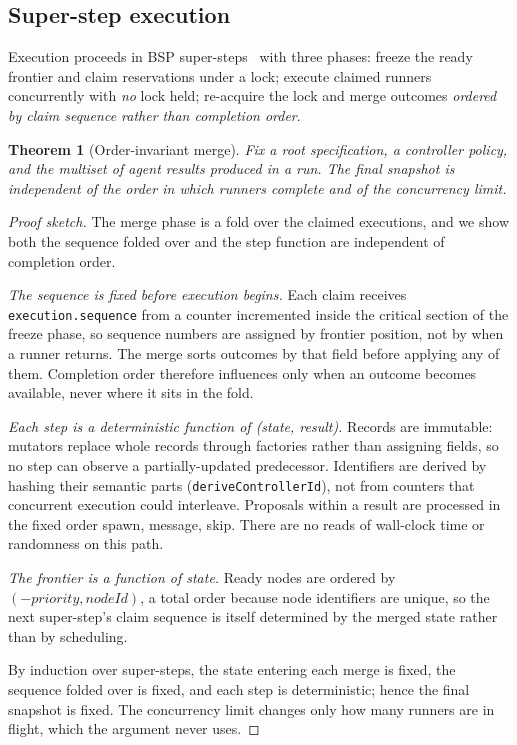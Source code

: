 \documentclass[10pt]{article}
\newtheorem{theorem}{Theorem}
\begin{document}
\subsection{Super-step execution}

Execution proceeds in BSP super-steps~\citep{valiant1990bsp} with three phases:
freeze the ready frontier and claim reservations under a lock; execute claimed
runners concurrently with \emph{no} lock held; re-acquire the lock and merge
outcomes \emph{ordered by claim sequence rather than completion order}.

\begin{theorem}[Order-invariant merge]
\label{thm:order}
Fix a root specification, a controller policy, and the multiset of agent results
produced in a run. The final snapshot is independent of the order in which
runners complete and of the concurrency limit.
\end{theorem}

\begin{proof}[Proof sketch]
The merge phase is a fold over the claimed executions, and we show both the
sequence folded over and the step function are independent of completion order.

\emph{The sequence is fixed before execution begins.} Each claim receives
\texttt{execution.sequence} from a counter incremented inside the critical
section of the freeze phase, so sequence numbers are assigned by frontier
position, not by when a runner returns. The merge sorts outcomes by that field
before applying any of them. Completion order therefore influences only when an
outcome becomes available, never where it sits in the fold.

\emph{Each step is a deterministic function of (state, result).} Records are
immutable: mutators replace whole records through factories rather than
assigning fields, so no step can observe a partially-updated predecessor.
Identifiers are derived by hashing their semantic parts
(\texttt{deriveControllerId}), not from counters that concurrent execution could
interleave. Proposals within a result are processed in the fixed order spawn,
message, skip. There are no reads of wall-clock time or randomness on this path.

\emph{The frontier is a function of state.} Ready nodes are ordered by
$(-\mathit{priority}, \mathit{nodeId})$, a total order because node identifiers
are unique, so the next super-step's claim sequence is itself determined by the
merged state rather than by scheduling.

By induction over super-steps, the state entering each merge is fixed, the
sequence folded over is fixed, and each step is deterministic; hence the final
snapshot is fixed. The concurrency limit changes only how many runners are
in flight, which the argument never uses.
\end{proof}
\end{document}
